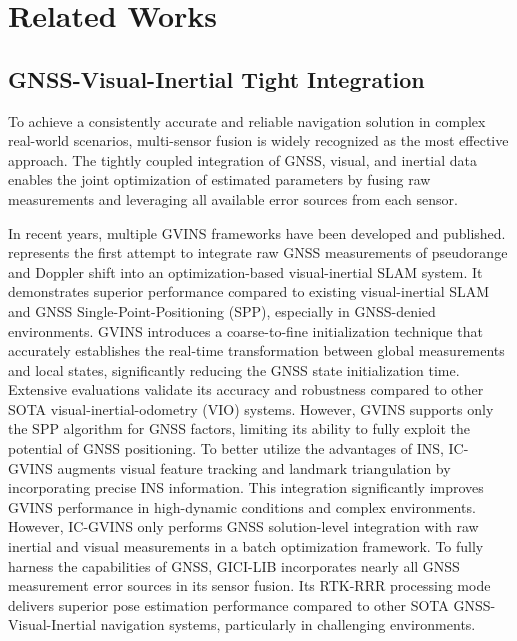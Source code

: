 \section{Related Works}
\subsection{GNSS-Visual-Inertial Tight Integration}
To achieve a consistently accurate and reliable navigation solution in complex real-world scenarios, multi-sensor fusion is widely recognized as the most effective approach. The tightly coupled integration of GNSS, visual, and inertial data enables the joint optimization of estimated parameters by fusing raw measurements and leveraging all available error sources from each sensor.

In recent years, multiple GVINS frameworks have been developed and published. \cite{ref29} represents the first attempt to integrate raw GNSS measurements of pseudorange and Doppler shift into an optimization-based visual-inertial SLAM system. It demonstrates superior performance compared to existing visual-inertial SLAM and GNSS Single-Point-Positioning (SPP), especially in GNSS-denied environments. GVINS \cite{ref3} introduces a coarse-to-fine initialization technique that accurately establishes the real-time transformation between global measurements and local states, significantly reducing the GNSS state initialization time. Extensive evaluations validate its accuracy and robustness compared to other SOTA visual-inertial-odometry (VIO) systems. However, GVINS supports only the SPP algorithm for GNSS factors, limiting its ability to fully exploit the potential of GNSS positioning. To better utilize the advantages of INS, IC-GVINS \cite{ref4} augments visual feature tracking and landmark triangulation by incorporating precise INS information. This integration significantly improves GVINS performance in high-dynamic conditions and complex environments. However, IC-GVINS only performs GNSS solution-level integration with raw inertial and visual measurements in a batch optimization framework. To fully harness the capabilities of GNSS, GICI-LIB \cite{ref2} incorporates nearly all GNSS measurement error sources in its sensor fusion. Its RTK-RRR processing mode delivers superior pose estimation performance compared to other SOTA GNSS-Visual-Inertial navigation systems, particularly in challenging environments.

